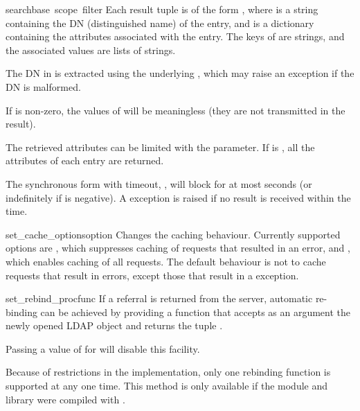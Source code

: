 \begin{funcdesc}{search}{base\, scope\, filter}
Each result tuple is of the form , 
where  is a string containing
the DN (distinguished name) of the entry, and 
 is a dictionary
containing the attributes associated with the entry. 
The keys of  are strings, 
and the associated values are lists of strings.

The DN in  is extracted using the underlying ,
which may raise an exception if the DN is malformed.

If  is non-zero, the values of  will be meaningless
(they are not transmitted in the result).

The retrieved attributes can be limited with the  parameter.
If  is , all the attributes of each entry are returned.

The synchronous form with timeout, , will block for at most
 seconds (or indefinitely if  is negative). A
 exception is raised if no result is received within the
time.
\end{funcdesc}


\begin{funcdesc}{set_cache_options}{option}
Changes the caching behaviour. Currently supported options are
    , which suppresses caching of requests
    	that resulted in an error, and
    , which enables caching of all requests.
The default behaviour is not to cache requests that result in errors, except 
those that result in a  exception.
\end{funcdesc}


\begin{funcdesc}{set_rebind_proc}{func}
If a referral is returned from the server, automatic
re-binding can be achieved by providing a function that accepts as an argument
the newly opened LDAP object and returns the tuple .

Passing a value of  for  will disable
this facility. 

Because of restrictions in the implementation, only one
rebinding function is supported at any one time. This method is only
available if the module and library were compiled with .
\end{funcdesc}

